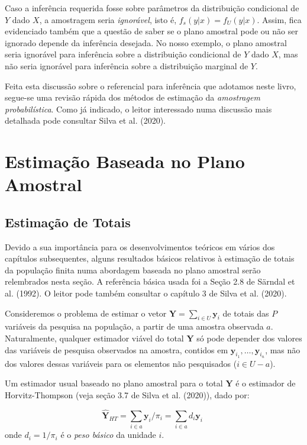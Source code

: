 \documentclass[
  12pt,
  brazilian,
]{book}
\theoremstyle{definition}
\theoremstyle{definition}
\theoremstyle{definition}
\theoremstyle{definition}
\theoremstyle{remark}
\begin{document}
Caso a inferência requerida fosse sobre parâmetros da distribuição condicional
de \(Y\) dado \(X\), a amostragem seria \emph{ignorável}, isto é, \(f_s ( y | x) = f_U (y | x)\).
Assim, fica evidenciado também que a questão de saber se o plano amostral pode
ou não ser ignorado depende da inferência desejada. No nosso exemplo, o plano amostral
seria ignorável para inferência sobre a distribuição condicional de \(Y\) dado \(X\),
mas não seria ignorável para inferência sobre a distribuição marginal de \(Y\).

Feita esta discussão sobre o referencial para inferência que adotamos neste
livro, segue-se uma revisão rápida dos métodos de estimação da \emph{amostragem probabilística}.
Como já indicado, o leitor interessado numa discussão mais detalhada pode consultar Silva et al. (2020).

\hypertarget{capplanamo}{%
\chapter{Estimação Baseada no Plano Amostral}\label{capplanamo}}

\hypertarget{estimatotais}{%
\section{Estimação de Totais}\label{estimatotais}}

Devido a sua importância para os desenvolvimentos teóricos em vários dos capítulos subsequentes, alguns resultados básicos relativos à estimação de totais da população finita numa abordagem baseada no plano amostral serão relembrados nesta seção. A referência básica usada foi a Seção 2.8 de Särndal et al. (1992). O leitor pode também consultar o capítulo 3 de Silva et al. (2020).

Consideremos o problema de estimar o vetor \(\mathbf{Y} = \sum_{i \in U} \mathbf{y}_i\) de totais das \(P\) variáveis da pesquisa na população, a partir de uma amostra observada \(a\). Naturalmente, qualquer estimador viável do total \(\mathbf{Y}\) só pode depender dos valores das variáveis de pesquisa observados na amostra, contidos em \(\mathbf{y}_{i_{1}}, \ldots , \mathbf{y}_{i_{n}}\), mas não dos valores dessas variáveis para os elementos não pesquisados (\(i \in U-a\)).

Um estimador usual baseado no plano amostral para o total \(\mathbf{Y}\) é o estimador de Horvitz-Thompson (veja seção 3.7 de Silva et al. (2020)), dado por:

\[
\widehat{\mathbf{Y}}_{HT} = \sum_{i \in a} \mathbf{y}_i / \pi_{i} = \sum_{i \in a} d_i \mathbf{y}_i \,\,  \label{eq:estpa1}
\]
onde \(d_i = 1/\pi_i\) é o \emph{peso básico} da unidade \(i\).
\end{document}
